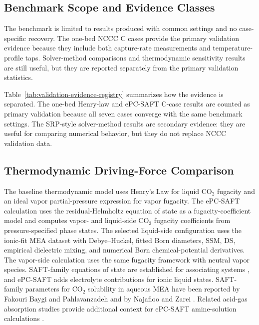     \subsection{Benchmark Scope and Evidence Classes}
        The benchmark is limited to results produced with common settings and no case-specific recovery. The one-bed NCCC C cases provide the primary validation evidence because they include both capture-rate measurements and temperature-profile taps. Solver-method comparisons and thermodynamic sensitivity results are still useful, but they are reported separately from the primary validation statistics.

        Table~\ref{tab:validation-evidence-registry} summarizes how the evidence is separated. The one-bed Henry-law and ePC-SAFT C-case results are counted as primary validation because all seven cases converge with the same benchmark settings. The SRP-style solver-method results are secondary evidence: they are useful for comparing numerical behavior, but they do not replace NCCC validation data.

        

    \subsection{Thermodynamic Driving-Force Comparison}
        The baseline thermodynamic model uses Henry's Law for liquid CO$_2$ fugacity and an ideal vapor partial-pressure expression for vapor fugacity. The ePC-SAFT calculation uses the residual-Helmholtz equation of state as a fugacity-coefficient model and computes vapor- and liquid-side CO$_2$ fugacity coefficients from pressure-specified phase states. The selected liquid-side configuration uses the ionic-fit MEA dataset with Debye--Huckel, fitted Born diameters, SSM, DS, empirical dielectric mixing, and numerical Born chemical-potential derivatives. The vapor-side calculation uses the same fugacity framework with neutral vapor species. SAFT-family equations of state are established for associating systems \cite{Gross2001,Cameretti2005}, and ePC-SAFT adds electrolyte contributions for ionic liquid states. SAFT-family parameters for CO$_2$ solubility in aqueous MEA have been reported by Fakouri Baygi and Pahlavanzadeh and by Najafloo and Zarei \cite{Baygi2015,Najafloo2018}. Related acid-gas absorption studies provide additional context for ePC-SAFT amine-solution calculations \cite{Cleeton2020,Bulow2021a}.

